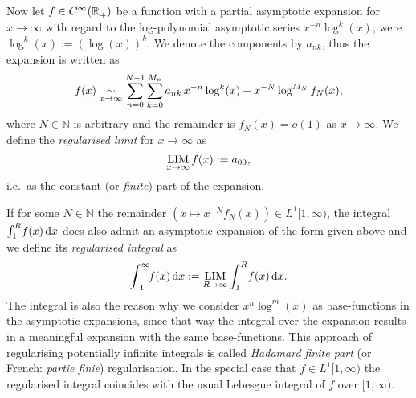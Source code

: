 Now let $f\in\Cinf(\Rplus)$ be a function with a partial asymptotic expansion
for $x\to\infty$ with regard to the log-polynomial asymptotic series
$x^{-n}\log^k(x)$, were $\log^k(x) := (\log(x))^k$. We denote the components by
$a_{nk}$, thus the expansion is written as
\begin{equation*}
  f(x) \SimAs{x\to\infty} \sum_{n=0}^{N-1}\sum_{k=0}^{M_n}
  a_{nk}\,x^{-n}\log^k(x) + x^{-N}\log^{M_N}f_N(x),
\end{equation*}
where $N\in\mathbb{N}$ is arbitrary and the remainder is $f_N(x) = o(1)$ as
$x\to\infty$. We define the \emph{regularised limit} for $x\to\infty$ as
\begin{equation}
  \Reglim_{x\to\infty} f(x) := a_{00},
\end{equation}
i.e.\ as the constant (or \emph{finite}) part of the expansion.

If for some $N\in\mathbb{N}$ the remainder $(x\mapsto x^{-N}f_N(x))\in
L^1[1,\infty)$, the integral $\Integ[R]{1}{x}{f(x)}$ does also admit an
asymptotic expansion of the form given above and we define its \emph{regularised
integral} as
\begin{equation}
  \Regint{x}{f(x)} := \Reglim_{R\to\infty}\Integ[R]{1}{x}{f(x)}.
\end{equation}
The integral is also the reason why we consider $x^n \log^m(x)$ as
base-functions in the asymptotic expansions, since that way the integral over
the expansion results in a meaningful expansion with the same base-functions.
This approach of regularising potentially infinite integrals is called
\emph{Hadamard finite part} (or French: \textit{partie finie}) regularisation.
In the special case that $f\in L^1[1,\infty)$ the regularised integral coincides
with the usual Lebesgue integral of $f$ over $[1,\infty)$.

